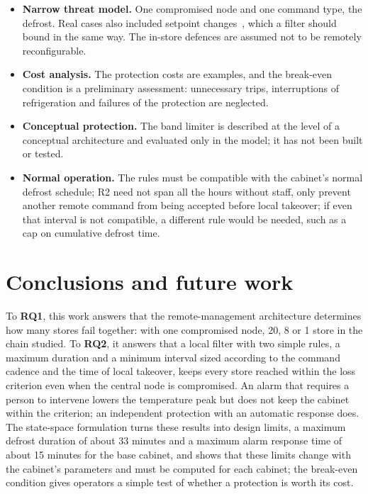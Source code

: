 \documentclass{ceurart}
\begin{document}
\begin{itemize}
  \item \textbf{Narrow threat model.} One compromised node and one command type, the defrost. Real cases also included setpoint changes~\cite{cyber360cases2026}, which a filter should bound in the same way. The in-store defences are assumed not to be remotely reconfigurable.
  \item \textbf{Cost analysis.} The protection costs are examples, and the break-even condition is a preliminary assessment: unnecessary trips, interruptions of refrigeration and failures of the protection are neglected.
  \item \textbf{Conceptual protection.} The band limiter is described at the level of a conceptual architecture and evaluated only in the model; it has not been built or tested.
  \item \textbf{Normal operation.} The rules must be compatible with the cabinet's normal defrost schedule; R2 need not span all the hours without staff, only prevent another remote command from being accepted before local takeover; if even that interval is not compatible, a different rule would be needed, such as a cap on cumulative defrost time.
\end{itemize}

\section{Conclusions and future work}
\label{sec:conclusions}

To \textbf{RQ1}, this work answers that the remote-management architecture determines how many stores fail together: with one compromised node, 20, 8 or 1 store in the chain studied.
To \textbf{RQ2}, it answers that a local filter with two simple rules, a maximum duration and a minimum interval sized according to the command cadence and the time of local takeover, keeps every store reached within the loss criterion even when the central node is compromised.
An alarm that requires a person to intervene lowers the temperature peak but does not keep the cabinet within the criterion; an independent protection with an automatic response does.
The state-space formulation turns these results into design limits, a maximum defrost duration of about 33 minutes and a maximum alarm response time of about 15 minutes for the base cabinet, and shows that these limits change with the cabinet's parameters and must be computed for each cabinet; the break-even condition gives operators a simple test of whether a protection is worth its cost.
\end{document}
